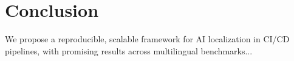  \section{Conclusion}
We propose a reproducible, scalable framework for AI localization in CI/CD pipelines, with promising results across multilingual benchmarks...

